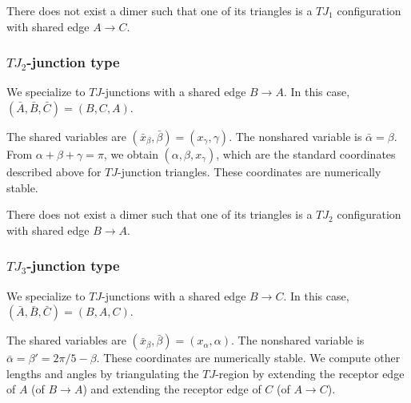 There does not exist a dimer such that one of its triangles
is a $TJ_1$ configuration with shared edge $A\to C$.

\subsubsection{$TJ_2$-junction type}

We specialize to $TJ$-junctions with a shared edge $B\to A$. In this
case, $(\bar A,\bar B,\bar C)=(B,C,A)$.

The shared variables are $(\bar x_\beta,\bar\beta)=(x_\gamma,\gamma)$.
The nonshared variable is $\bar\alpha =\beta$.  From
$\alpha+\beta+\gamma=\pi$, we obtain $(\alpha,\beta,x_\gamma)$, which
are the standard coordinates described above for $TJ$-junction
triangles.  These coordinates are numerically stable.

There does not exist a dimer such that one of its triangles
is a $TJ_2$ configuration with shared edge $B\to A$.

\subsubsection{$TJ_3$-junction type}

We specialize to $TJ$-junctions with a shared edge $B\to C$.
In this case, $(\bar A,\bar B,\bar C)=(B,A,C)$.

The shared variables are $(\bar x_\beta,\bar\beta)=(x_\alpha,\alpha)$.
The nonshared variable is $\bar\alpha=\beta'=2\pi/5-\beta$.  These
coordinates are numerically stable.  We compute other lengths and
angles by triangulating the $TJ$-region by extending the receptor edge
of $A$ (of $B\to A$) and extending the receptor edge of $C$ (of $A\to
C$).

